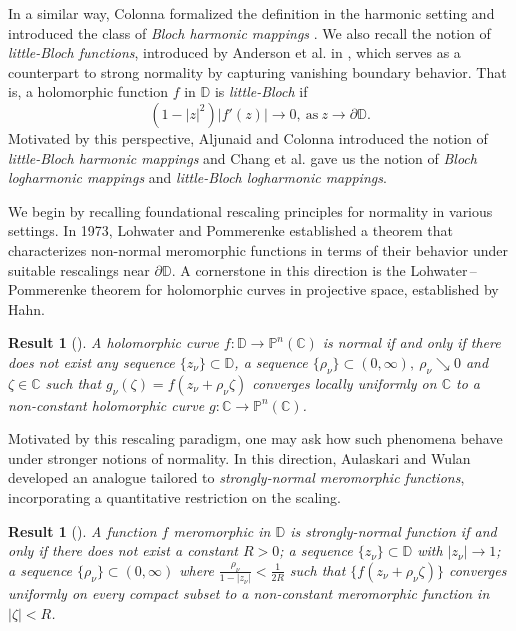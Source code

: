 \documentclass[10pt,a4paper]{amsart}
\newtheorem{Result}[theorem]{Result}
\numberwithin{equation}{section}
\begin{document}
 In a similar way, Colonna formalized the definition in the harmonic setting 
 and introduced the class of \emph{Bloch harmonic mappings} 
 \cite{colonna-tbcobhm-1989}. We also recall the notion of \emph{little-Bloch functions}, introduced by Anderson et al. in \cite{anderson-obfanf-1974},
 which serves as a counterpart to strong normality by capturing vanishing boundary 
 behavior. That is, a holomorphic function $f$ in $\mathbb D$ is \emph{little-Bloch} if
 \begin{equation*}(1-|z|^2)|f'(z)|\to 0,\ \text{as}\ z\to\partial\mathbb D.\end{equation*}
 Motivated by this 
 perspective, Aljunaid and Colonna \cite{aljuain-cobtsohm-2019} introduced the notion of \emph{little-Bloch harmonic mappings} and Chang et al. 
 \cite{chang-csolmalbtc-2026} gave us the notion of \emph{Bloch logharmonic mappings} and \emph{little-Bloch logharmonic mappings}.\smallskip
 
We begin by recalling foundational rescaling principles for normality in various settings. In 
1973, Lohwater and Pommerenke \cite[Theorem 1]{lohwater-onmf-1973} established a theorem that characterizes non-normal meromorphic functions
in terms of their behavior under suitable rescalings near $\partial\mathbb D$. A cornerstone in 
this direction is the Lohwater\,–\,Pommerenke theorem for holomorphic curves in projective space, established by Hahn.
\begin{Result}[{\cite[Theorem 4]{hahn-hdgosctonmf-2007}}]\label{R:LPNHC} 
A holomorphic curve $f:\mathbb{D}\to \mathbb P^n(\mathbb C)$ is normal if and only if there does not
exist any sequence $\{z_{\nu}\}\subset \mathbb{D}$, a sequence $\{\rho_{\nu} \}\subset(0,\infty),\ \rho_{\nu} \searrow 0$
and $\zeta\in \mathbb C$ such that $g_{\nu}(\zeta)=f(z_{\nu}+\rho_{\nu} \zeta)$ converges locally uniformly on $\mathbb C$ to a non-constant 
holomorphic curve $g:\mathbb C\to \mathbb P^n{(\mathbb C)}$. 
\end{Result}
Motivated by this rescaling paradigm, one may ask how such phenomena behave under stronger notions of 
normality. In this direction, Aulaskari and Wulan developed an analogue tailored to \emph{strongly-normal meromorphic functions},
incorporating a quantitative restriction on the scaling.
\begin{Result} [{\cite[Theorem 1]{aulaskari-avotlptfsnf-2001}}] \label{R:LPMF}
A function $f$ meromorphic in $\mathbb{D}$ is strongly-normal function
if and only if there does not exist a constant $R>0$; a sequence $\{z_{\nu}\}\subset \mathbb{D}$ with $|z_{\nu}|\to1$; 
a sequence $\{\rho_{\nu} \}\subset(0,\infty)$ where $\displaystyle\frac{\rho_{\nu} }{1-|z_{\nu}|}<\frac{1}{2R}$ such that $\{f(z_{\nu}+\rho_{\nu} \zeta)\}$ converges uniformly on every 
compact subset to a non-constant meromorphic function in $|\zeta|<R$.
\end{Result}
\end{document}
